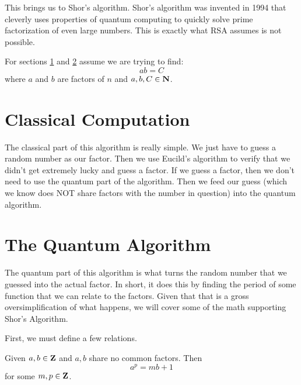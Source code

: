 \documentclass[a4paper]{article}
\begin{document}
This brings us to Shor's algorithm. Shor's algorithm was invented in 1994 that cleverly uses properties of quantum computing to quickly solve prime factorization of even large numbers. This is exactly what RSA assumes is not possible.

For sections \ref{classicalSec} and \ref{quantumSec} assume we are trying to find: 
$$ab = C$$
where $a$ and $b$ are factors of $n$ and $a,b,C \in \mathbf{N}$.

\section{Classical Computation}
\label{classicalSec}
The classical part of this algorithm is really simple. We just have to guess a random number as our factor. Then we use Eucild's algorithm to verify that we didn't get extremely lucky and guess a factor. If we guess a factor, then we don't need to use the quantum part of the algorithm. Then we feed our guess (which we know does NOT share factors with the number in question) into the quantum algorithm. 


\section{The Quantum Algorithm}
\label{quantumSec}

The quantum part of this algorithm is what turns the random number that we guessed into the actual factor. In short, it does this by finding the period of some function that we can relate to the factors. Given that that is a gross oversimplification of what happens, we will cover some of the math supporting Shor's Algorithm. 

First, we must define a few relations. 

\begin{theorem} %

Given $a,b \in \mathbf{Z}$ and $a,b$ share no common factors. Then 
$$a^p = mb + 1$$
for some $m,p \in \mathbf{Z}$.
\label{nonCommonPower}
\end{theorem}

\end{document}
